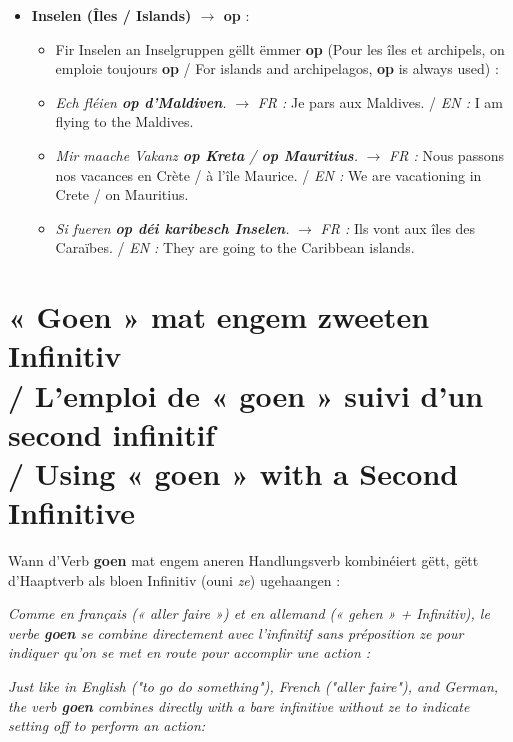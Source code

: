 \begin{itemize}
    \item \textbf{Inselen (Îles / Islands) $\rightarrow$ op} :
    \begin{itemize}
        \item Fir Inselen an Inselgruppen gëllt ëmmer \textbf{op} (Pour les îles et archipels, on emploie toujours \textbf{op} / For islands and archipelagos, \textbf{op} is always used) :
        \item \textit{Ech fléien \textbf{op d'Maldiven}.} $\rightarrow$ \textit{FR :} Je pars aux Maldives. / \textit{EN :} I am flying to the Maldives.
        \item \textit{Mir maache Vakanz \textbf{op Kreta} / \textbf{op Mauritius}.} $\rightarrow$ \textit{FR :} Nous passons nos vacances en Crète / à l'île Maurice. / \textit{EN :} We are vacationing in Crete / on Mauritius.
        \item \textit{Si fueren \textbf{op déi karibesch Inselen}.} $\rightarrow$ \textit{FR :} Ils vont aux îles des Caraïbes. / \textit{EN :} They are going to the Caribbean islands.
    \end{itemize}
\end{itemize}

\vspace{1.5em}

\section[Goen mat engem zweeten Infinitiv / Goen with Second Infinitive]{« Goen » mat engem zweeten Infinitiv \\/ L'emploi de « goen » suivi d'un second infinitif \\/ Using « goen » with a Second Infinitive}

Wann d'Verb \textbf{goen} mat engem aneren Handlungsverb kombinéiert gëtt, gëtt d'Haaptverb als bloen Infinitiv (ouni \textit{ze}) ugehaangen :

\textit{Comme en français (« aller faire ») et en allemand (« gehen » + Infinitiv), le verbe \textbf{goen} se combine directement avec l'infinitif sans préposition \textit{ze} pour indiquer qu'on se met en route pour accomplir une action :}

\textit{Just like in English ("to go do something"), French ("aller faire"), and German, the verb \textbf{goen} combines directly with a bare infinitive without \textit{ze} to indicate setting off to perform an action:}

